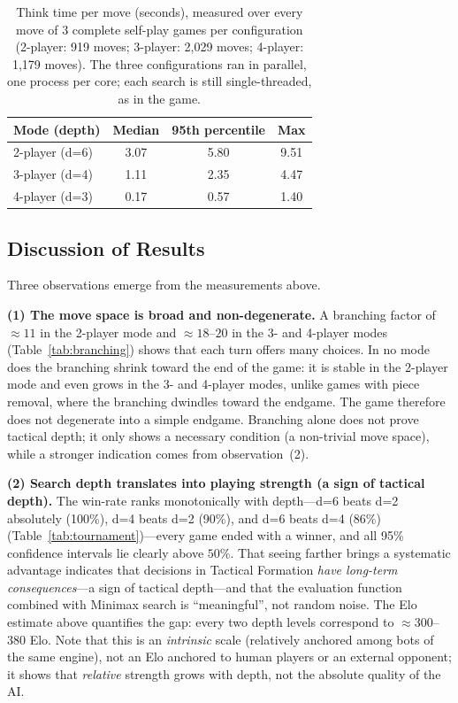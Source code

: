 \begin{table}[H]
  \centering
  \caption{Think time per move (seconds), measured over every move of 3
  complete self-play games per configuration (2-player: 919 moves;
  3-player: 2,029 moves; 4-player: 1,179 moves). The three configurations ran
  in parallel, one process per core; each search is still single-threaded,
  as in the game.}
  \label{tab:timing}
  \begin{tabular}{lccc}
    \toprule
    \textbf{Mode (depth)} & \textbf{Median} & \textbf{95th percentile}
      & \textbf{Max} \\
    \midrule
    2-player (d=6) & 3.07 & 5.80 & 9.51 \\
    3-player (d=4) & 1.11 & 2.35 & 4.47 \\
    4-player (d=3) & 0.17 & 0.57 & 1.40 \\
    \bottomrule
  \end{tabular}
\end{table}

\subsection{Discussion of Results}
\label{sec:eval_discussion}

Three observations emerge from the measurements above.

\textbf{(1) The move space is broad and non-degenerate.} A branching factor
of $\approx 11$ in the 2-player mode and $\approx 18$--$20$ in the 3- and
4-player modes (Table~\ref{tab:branching}) shows that each turn offers many
choices. In no mode does the branching shrink toward the end of the game: it
is stable in the 2-player mode and even grows in the 3- and 4-player modes,
unlike games with piece removal, where the branching dwindles toward the
endgame. The game therefore does not degenerate into a simple endgame.
Branching alone does not prove tactical depth; it only shows a necessary
condition (a non-trivial move space), while a stronger indication comes from
observation~(2).

\textbf{(2) Search depth translates into playing strength (a sign of
tactical depth).} The win-rate ranks monotonically with depth---d=6 beats
d=2 absolutely (100\%), d=4 beats d=2 (90\%), and d=6 beats d=4 (86\%)
(Table~\ref{tab:tournament})---every game ended with a winner, and all 95\%
confidence intervals lie clearly above $50\%$. That seeing farther brings a
systematic advantage indicates that decisions in Tactical Formation \emph{have
long-term consequences}---a sign of tactical depth---and that the evaluation
function combined with Minimax search is ``meaningful'', not random noise.
The Elo estimate above quantifies the gap: every two depth
levels correspond to $\approx 300$--$380$ Elo. Note that this is an
\emph{intrinsic} scale (relatively anchored among bots of the same engine),
not an Elo anchored to human players or an external opponent; it shows that
\emph{relative} strength grows with depth, not the absolute quality of the
AI.

